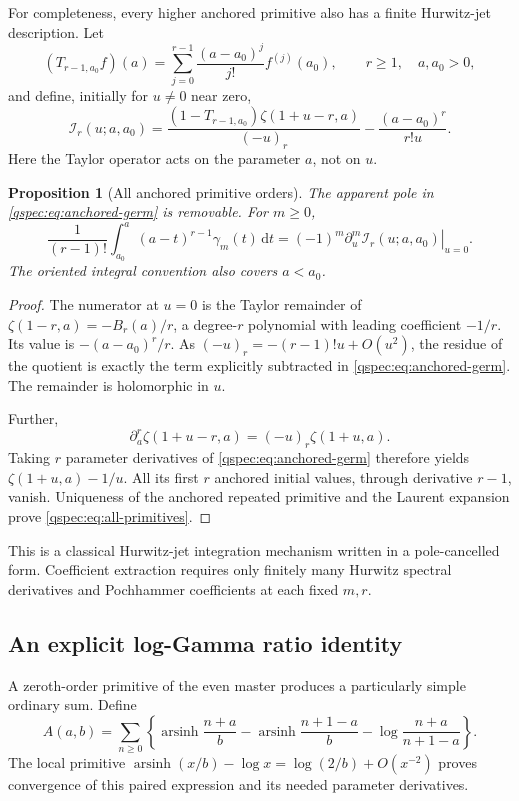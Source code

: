 \documentclass[11pt,letterpaper]{article}
\numberwithin{equation}{section}
\newtheorem{proposition}[theorem]{Proposition}
\theoremstyle{definition}
\newcommand{\arsinh}{\operatorname{arsinh}}
\newcommand{\dd}{\,\mathrm{d}}
\begin{document}
For completeness, every higher anchored primitive also has a finite
Hurwitz-jet description. Let
\[
(T_{r-1,a_0}f)(a)=\sum_{j=0}^{r-1}\frac{(a-a_0)^j}{j!}f^{(j)}(a_0),
\qquad r\ge1,\quad a,a_0>0,
\]
and define, initially for $u\ne0$ near zero,
\begin{equation}\label{qspec:eq:anchored-germ}
\mathcal I_r(u;a,a_0)=
\frac{(1-T_{r-1,a_0})\zeta(1+u-r,a)}{(-u)_r}
-\frac{(a-a_0)^r}{r!u}.
\end{equation}
Here the Taylor operator acts on the parameter $a$, not on $u$.

\begin{proposition}[All anchored primitive orders]
\label{qspec:prop:all-primitives}
The apparent pole in \eqref{qspec:eq:anchored-germ} is removable. For
$m\ge0$,
\begin{equation}\label{qspec:eq:all-primitives}
\frac1{(r-1)!}\int_{a_0}^a(a-t)^{r-1}\gamma_m(t)\dd t
=(-1)^m\left.\partial_u^m\mathcal I_r(u;a,a_0)\right|_{u=0}.
\end{equation}
The oriented integral convention also covers $a<a_0$.
\end{proposition}
\begin{proof}
The numerator at $u=0$ is the Taylor remainder of
$\zeta(1-r,a)=-B_r(a)/r$, a degree-$r$ polynomial with leading
coefficient $-1/r$. Its value is $-(a-a_0)^r/r$.
As $(-u)_r=-(r-1)!u+O(u^2)$, the residue of the quotient is exactly
the term explicitly subtracted in \eqref{qspec:eq:anchored-germ}.
The remainder is holomorphic in $u$.

Further,
\[
\partial_a^r\zeta(1+u-r,a)=(-u)_r\zeta(1+u,a).
\]
Taking $r$ parameter derivatives of \eqref{qspec:eq:anchored-germ}
therefore yields $\zeta(1+u,a)-1/u$. All its first $r$ anchored
initial values, through derivative $r-1$, vanish. Uniqueness of the
anchored repeated primitive and the Laurent expansion prove
\eqref{qspec:eq:all-primitives}.
\end{proof}
This is a classical Hurwitz-jet integration mechanism written in a
pole-cancelled form. Coefficient extraction requires only finitely many
Hurwitz spectral derivatives and Pochhammer coefficients at each fixed
$m,r$.

\subsection{An explicit log-Gamma ratio identity}
A zeroth-order primitive of the even master produces a particularly
simple ordinary sum. Define
\begin{equation}\label{qspec:eq:A}
A(a,b)=\sum_{n\ge0}\left\{
\arsinh\frac{n+a}{b}-\arsinh\frac{n+1-a}{b}
-\log\frac{n+a}{n+1-a}\right\}.
\end{equation}
The local primitive
$\arsinh(x/b)-\log x=\log(2/b)+O(x^{-2})$ proves convergence of this
paired expression and its needed parameter derivatives.
\end{document}
